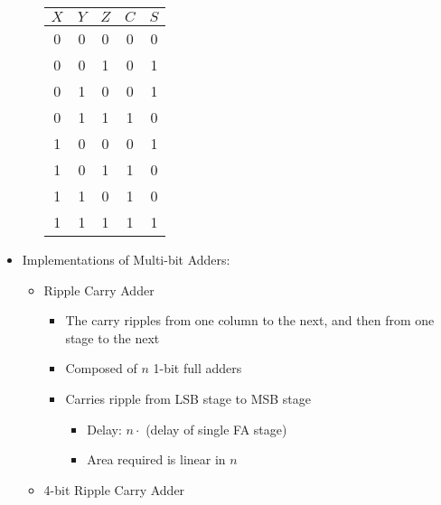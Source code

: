 \begin{itemize}
\begin{itemize}
        \begin{center}
          \begin{tabular}[h!]{c c c | c c}
            $X$ & $Y$ & $Z$ & $C$ & $S$\\
            \hline
             0 & 0 & 0 & 0 & 0\\
             0 & 0 & 1 & 0 & 1\\
             0 & 1 & 0 & 0 & 1\\
             0 & 1 & 1 & 1 & 0\\
             1 & 0 & 0 & 0 & 1\\ 
             1 & 0 & 1 & 1 & 0\\
             1 & 1 & 0 & 1 & 0\\ 
             1 & 1 & 1 & 1 & 1\\
          \end{tabular}
        \end{center}

    \end{itemize}

  \item Implementations of Multi-bit Adders:

    \begin{itemize}

      \item Ripple Carry Adder

        \begin{itemize}

          \item The carry ripples from one column to the next, and then from one stage to the next

          \item Composed of $n$ 1-bit full adders

          \item Carries ripple from LSB stage to MSB stage

            \begin{itemize}

              \item Delay: $n\cdot$ (delay of single FA stage)

              \item Area required is linear in $n$

            \end{itemize}

        \end{itemize}

      \item 4-bit Ripple Carry Adder


\end{itemize}
\end{itemize}
